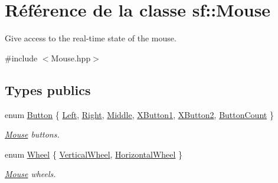 \hypertarget{classsf_1_1Mouse}{}\section{Référence de la classe sf\+:\+:Mouse}
\label{classsf_1_1Mouse}


Give access to the real-\/time state of the mouse.  




{\ttfamily \#include $<$Mouse.\+hpp$>$}

\subsection*{Types publics}
\begin{DoxyCompactItemize}
\item 
enum \hyperlink{classsf_1_1Mouse_a4fb128be433f9aafe66bc0c605daaa90}{Button} \{ \newline
\hyperlink{classsf_1_1Mouse_a4fb128be433f9aafe66bc0c605daaa90a8bb4856e1ec7f6b6a8605effdfc0eee8}{Left}, 
\hyperlink{classsf_1_1Mouse_a4fb128be433f9aafe66bc0c605daaa90af2cff24ab6c26daf079b11189f982fc4}{Right}, 
\hyperlink{classsf_1_1Mouse_a4fb128be433f9aafe66bc0c605daaa90a2c353189c4b11cf216d7caddafcc609d}{Middle}, 
\hyperlink{classsf_1_1Mouse_a4fb128be433f9aafe66bc0c605daaa90aecc7f3ce9ad6a60b9b0027876446b8d7}{X\+Button1}, 
\newline
\hyperlink{classsf_1_1Mouse_a4fb128be433f9aafe66bc0c605daaa90a03fa056fd0dd9d629c205d91a8ef1b5a}{X\+Button2}, 
\hyperlink{classsf_1_1Mouse_a4fb128be433f9aafe66bc0c605daaa90a52a1d434289774240ddaa22496762402}{Button\+Count}
 \}\begin{DoxyCompactList}\small\item\em \hyperlink{classsf_1_1Mouse}{Mouse} buttons. \end{DoxyCompactList}
\item 
enum \hyperlink{classsf_1_1Mouse_a60dd479a43f26f200e7957aa11803ff4}{Wheel} \{ \hyperlink{classsf_1_1Mouse_a60dd479a43f26f200e7957aa11803ff4abd571de908d2b2c4b9f165f29c678496}{Vertical\+Wheel}, 
\hyperlink{classsf_1_1Mouse_a60dd479a43f26f200e7957aa11803ff4a785768d5e33c77de9fdcfdd02219f4e2}{Horizontal\+Wheel}
 \}\begin{DoxyCompactList}\small\item\em \hyperlink{classsf_1_1Mouse}{Mouse} wheels. \end{DoxyCompactList}
\end{DoxyCompactItemize}
